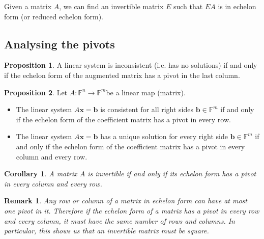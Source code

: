 \documentclass[12pt, a4paper]{article}
\newtheorem*{remark}{Remark}
\theoremstyle{definition}
\newtheorem{proposition}{Proposition}
\theoremstyle{plain}
\newtheorem{corollary}{Corollary}[theorem]
\newcommand{\bb}[1]{\mathbb{#1}}
\newcommand{\vect}[1]{\mathbf{#1}}
\begin{document}
\begin{tcolorbox}
Given a matrix $A$, we can find an invertible matrix $E$ such that $EA$ is in echelon form (or reduced echelon form).
\end{tcolorbox}

\subsection{Analysing the pivots}

\begin{proposition} A linear system is inconsistent (i.e. has no solutions) if and only if the echelon form of the augmented matrix has a pivot in the last column. \end{proposition}

\begin{proposition} Let $A : \bb{F}^n \rightarrow \bb{F}^m $be a linear map (matrix).
\begin{itemize}

	\item The linear system $A\vect{x} = \vect{b}$ is consistent for all right sides $\vect{b} \in \bb{F}^m$ if and only if the echelon form of the coefficient matrix has a pivot in every row.

	\item The linear system $A\vect{x} = \vect{b}$ has a unique solution for every right side $\vect{b} \in \bb{F}^m$ if and only if the echelon form of the coefficient matrix has a pivot in every column and every row. 

\end{itemize}

\end{proposition}

\begin{corollary}A matrix $A$ is invertible if and only if its echelon form has a pivot in every column and every row. \end{corollary}

\begin{remark}
Any row or column of a matrix in echelon form can have at most one pivot in it. Therefore if the echelon form of a matrix has a pivot in every row and every column, it must have the same number of rows and columns. In particular, this shows us that an invertible matrix must be square.
\end{remark}
\end{document}

